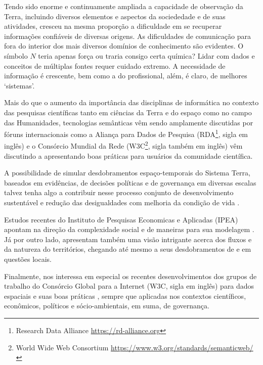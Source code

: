\documentclass[
	12pt,				%
	openany,			%
	oneside,			%
	a4paper,			%
	english,			%
	french,				%
	spanish,			%
	brazil,				%
	]{abntex2}
\begin{document}
Tendo sido enorme e continuamente ampliada a capacidade de observação da Terra, incluindo diversos elementos e aspectos da sociededade e de suas atividades, cresceu na mesma proporção a dificuldade em se recuperar informações confiáveis de diversas origens. As dificuldades de comunicação para fora do interior dos mais diversos domínios de conhecimento são evidentes. O símbolo $N$ teria apenas força ou traria consigo certa química? Lidar com dados e conceitos de múltiplas fontes requer cuidado extremo. A necessidade de informação é crescente, bem como a do profissional, além, é claro, de melhores `sistemas'.

Mais do que o aumento da importância das disciplinas de informática \cite{fox_rise_2012} no contexto das pesquisas científicas tanto em ciências da Terra e do espaço como no campo das Humanidades, tecnologias semânticas vêm sendo amplamente discutidas por fóruns internacionais como a Aliança para Dados de Pesquisa (RDA\footnote{Research Data Alliance \url{https://rd-alliance.org}}, sigla em inglês) e o Consórcio Mundial da Rede (W3C\footnote{World Wide Web Consortium \url{https://www.w3.org/standards/semanticweb/}}, sigla também em inglês) vêm discutindo a apresentando boas práticas para usuários da comunidade científica.

A possibilidade de simular desdobramentos espaço-temporais do Sistema Terra, baseados em evidências, de decisões políticas e de governança em diversas escalas talvez tenha algo a contribuir nesse processo conjunto de desenvolvimento sustentável e redução das desigualdades com melhoria da condição de vida \cite{patterson_exploring_2016}.

Estudos recentes do Instituto de Pesquisas Economicas e Aplicadas (IPEA) apontam na direção da complexidade social \cite{furtado_complexity_2015} e de maneiras para sua modelagem \cite{da_silva_territory_2015}. Já por outro lado,  apresentam também uma visão intrigante acerca dos fluxos e da natureza do territórios, chegando até mesmo a seus desdobramentos de e em questões locais.

Finalmente, nos interessa em especial os recentes desenvolvimentos dos grupos de trabalho do Consórcio Global para a Internet (W3C, sigla em inglês) para dados espaciais \cite{w3c_spatial_2015} e suas boas práticas \cite{w3c_w3c_2015,taylor_where_2015}, sempre que aplicadas nos contextos científicos, econômicos, políticos e sócio-ambientais, em suma, de governança.
\end{document}
